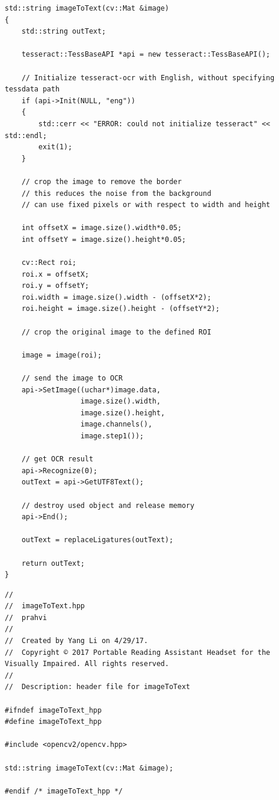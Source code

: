 \begin{lstlisting}
std::string imageToText(cv::Mat &image)
{
	std::string outText;
	
	tesseract::TessBaseAPI *api = new tesseract::TessBaseAPI();
	
	// Initialize tesseract-ocr with English, without specifying tessdata path
	if (api->Init(NULL, "eng"))
	{
		std::cerr << "ERROR: could not initialize tesseract" << std::endl;
		exit(1);
	}
	
	// crop the image to remove the border
	// this reduces the noise from the background
	// can use fixed pixels or with respect to width and height
	
	int offsetX = image.size().width*0.05;
	int offsetY = image.size().height*0.05;
	
	cv::Rect roi;
	roi.x = offsetX;
	roi.y = offsetY;
	roi.width = image.size().width - (offsetX*2);
	roi.height = image.size().height - (offsetY*2);
	
	// crop the original image to the defined ROI
	
	image = image(roi);
	
	// send the image to OCR
	api->SetImage((uchar*)image.data,
				  image.size().width,
				  image.size().height,
				  image.channels(),
				  image.step1());
	
	// get OCR result
	api->Recognize(0);
	outText = api->GetUTF8Text();
	
	// destroy used object and release memory
	api->End();
	
	outText = replaceLigatures(outText);
	
	return outText;
}

\end{lstlisting}

\begin{lstlisting}
//
//  imageToText.hpp
//  prahvi
//
//  Created by Yang Li on 4/29/17.
//  Copyright © 2017 Portable Reading Assistant Headset for the Visually Impaired. All rights reserved.
//
//	Description: header file for imageToText

#ifndef imageToText_hpp
#define imageToText_hpp

#include <opencv2/opencv.hpp>

std::string imageToText(cv::Mat &image);

#endif /* imageToText_hpp */

\end{lstlisting}

